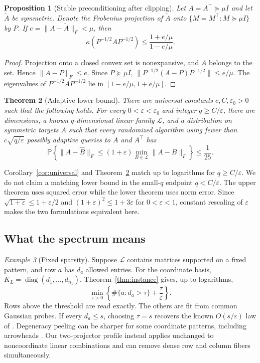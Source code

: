 \documentclass{article}
\newtheorem{theorem}{Theorem}
\newtheorem{proposition}[theorem]{Proposition}
\theoremstyle{remark}
\newtheorem{example}[theorem]{Example}
\newcommand{\Prb}{\mathbb P}
\newcommand{\cL}{\mathcal L}
\newcommand{\eps}{\varepsilon}
\newcommand{\1}{\mathbf 1}
\begin{document}
\begin{proposition}[Stable preconditioning after clipping]
\label{prop:preconditioning}
Let $A=A^\top\succeq\mu I$ and let $\widetilde A$ be symmetric.  Denote the Frobenius projection of $\widetilde A$ onto $\{M=M^\top:M\succeq\mu I\}$ by $P$.  If $e=\|A-\widetilde A\|_F<\mu$, then \[ \kappa(P^{-1/2}AP^{-1/2}) \le \frac{1+e/\mu}{1-e/\mu}. \]
\end{proposition}

\begin{proof}
Projection onto a closed convex set is nonexpansive, and $A$ belongs to the set.  Hence $\|A-P\|_F\le e$.  Since $P\succeq\mu I$, $\|P^{-1/2}(A-P)P^{-1/2}\|\le e/\mu$.  The eigenvalues of $P^{-1/2}AP^{-1/2}$ lie in $[1-e/\mu,1+e/\mu]$.
\end{proof}

\begin{theorem}[Adaptive lower bound]
\label{thm:lower}
There are universal constants $c,C,\eps_0>0$ such that the following holds. For every $0<\eps<\eps_0$ and integer $q\ge C/\eps$, there are dimensions, a known $q$-dimensional linear family $\cL$, and a distribution on symmetric targets $A$ such that every randomized algorithm using fewer than $c\sqrt{q/\eps}$ possibly adaptive queries to $A$ and $A^\top$ has \[ \Prb\!\left\{ \|A-\widehat B\|_F\le(1+\eps) \min_{B\in\cL}\|A-B\|_F \right\}\le\frac1{25}. \]
\end{theorem}

Corollary~\ref{cor:universal} and Theorem~\ref{thm:lower} match up to logarithms for $q\ge C/\eps$.  We do not claim a matching lower bound in the small-$q$ endpoint $q<C/\eps$.  The upper theorem uses squared error while the lower theorem uses norm error.  Since $\sqrt{1+\eps}\le1+\eps/2$ and $(1+\eps)^2\le1+3\eps$ for $0<\eps<1$, constant rescaling of $\eps$ makes the two formulations equivalent here.

\subsection{What the spectrum means}

\begin{example}[Fixed sparsity]
Suppose $\cL$ contains matrices supported on a fixed pattern, and row $a$ has $d_a$ allowed entries.  For the coordinate basis, $K_L=\operatorname{diag}(d_1,\ldots,d_{n_1})$.  Theorem~\ref{thm:instance} gives, up to logarithms,
\begin{equation}
 \min_{\tau>0}\left\{\#\{a:d_a>\tau\}+\frac{\tau}{\eps}\right\}.
 \label{eq:sparsity-profile}
\end{equation}
Rows above the threshold are read exactly.  The others are fit from common Gaussian probes.  If every $d_a\le s$, choosing $\tau=s$ recovers the known $O(s/\eps)$ law of \citet{amsel2026fixed}.  Degeneracy peeling can be sharper for some coordinate patterns, including arrowheads \citep{musco2026instance}. Our two-projector profile instead applies unchanged to noncoordinate linear combinations and can remove dense row and column fibers simultaneously.
\end{example}
\end{document}
